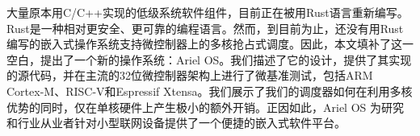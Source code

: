 
大量原本用C/C++实现的低级系统软件组件，目前正在被用Rust语言重新编写。Rust是一种相对更安全、更可靠的编程语言。然而，到目前为止，还没有用Rust编写的嵌入式操作系统支持微控制器上的多核抢占式调度。因此，本文填补了这一空白，提出了一个新的操作系统：Ariel OS。我们描述了它的设计，提供了其实现的源代码，并在主流的32位微控制器架构上进行了微基准测试，包括ARM Cortex-M、RISC-V和Espressif Xtensa。我们展示了我们的调度器如何在利用多核优势的同时，仅在单核硬件上产生极小的额外开销。正因如此，Ariel OS 为研究和行业从业者针对小型联网设备提供了一个便捷的嵌入式软件平台。